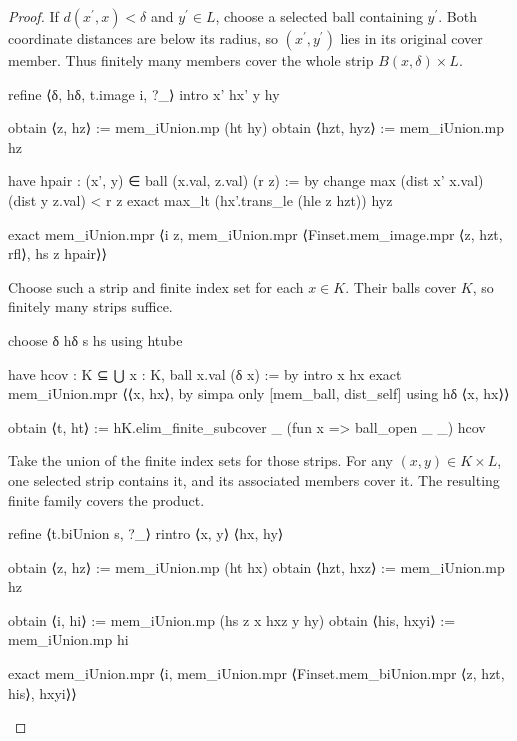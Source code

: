 \begin{proof}
  If $d(x^{\prime},x)<\delta$ and $y^{\prime}\in L$, choose a selected ball containing
  $y^{\prime}$.
  Both coordinate distances are below its radius, so $(x^{\prime},y^{\prime})$ lies in its original
  cover member.
  Thus finitely many members cover the whole strip $B(x,\delta)\times L$.

  \begin{lean}
    refine ⟨δ, hδ, t.image i, ?_⟩
    intro x' hx' y hy

    obtain ⟨z, hz⟩ := mem_iUnion.mp (ht hy)
    obtain ⟨hzt, hyz⟩ := mem_iUnion.mp hz

    have hpair : (x', y) ∈ ball (x.val, z.val) (r z) := by
      change max (dist x' x.val) (dist y z.val) < r z
      exact max_lt (hx'.trans_le (hle z hzt)) hyz

    exact mem_iUnion.mpr ⟨i z, mem_iUnion.mpr ⟨Finset.mem_image.mpr ⟨z, hzt, rfl⟩, hs z hpair⟩⟩
  \end{lean}

  Choose such a strip and finite index set for each $x\in K$.
  Their balls cover $K$, so finitely many strips suffice.

  \begin{lean}
    choose δ hδ s hs using htube

    have hcov : K ⊆ ⋃ x : K, ball x.val (δ x) := by
      intro x hx
      exact mem_iUnion.mpr ⟨⟨x, hx⟩, by simpa only [mem_ball, dist_self] using hδ ⟨x, hx⟩⟩

    obtain ⟨t, ht⟩ := hK.elim_finite_subcover _ (fun x => ball_open _ _) hcov
  \end{lean}

  Take the union of the finite index sets for those strips.
  For any $(x,y)\in K\times L$, one selected strip contains it, and its associated members cover
  it.
  The resulting finite family covers the product.

  \begin{lean}
    refine ⟨t.biUnion s, ?_⟩
    rintro ⟨x, y⟩ ⟨hx, hy⟩

    obtain ⟨z, hz⟩ := mem_iUnion.mp (ht hx)
    obtain ⟨hzt, hxz⟩ := mem_iUnion.mp hz

    obtain ⟨i, hi⟩ := mem_iUnion.mp (hs z x hxz y hy)
    obtain ⟨his, hxyi⟩ := mem_iUnion.mp hi

    exact mem_iUnion.mpr ⟨i, mem_iUnion.mpr ⟨Finset.mem_biUnion.mpr ⟨z, hzt, his⟩, hxyi⟩⟩
  \end{lean}

\end{proof}

